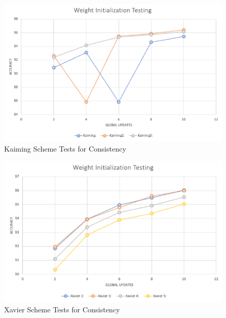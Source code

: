 \documentclass[../mthe-493-final-project.tex]{subfiles}
\begin{document}
    \begin{figure}
        \centering
        \includegraphics[width=165mm]{thesis/img/tool_select_2.png}
        \caption{Kaiming Scheme Tests for Consistency}
        \label{fig:test_k}
    \end{figure}
    
    \begin{figure}
        \centering
        \includegraphics[width=165mm]{thesis/img/tool_select_3.png}
        \caption{Xavier Scheme Tests for Consistency}
        \label{fig:test_x}
    \end{figure}
\end{document}
